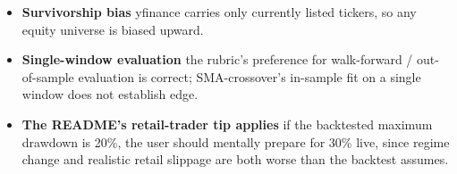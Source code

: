 \begin{itemize}
  \item \textbf{Survivorship bias} \textemdash{} yfinance carries only currently
        listed tickers, so any equity universe is biased upward.
  \item \textbf{Single-window evaluation} \textemdash{} the rubric's preference for
        walk-forward / out-of-sample evaluation is correct; SMA-crossover's
        in-sample fit on a single window does not establish edge.
  \item \textbf{The README's retail-trader tip applies} \textemdash{} if the
        backtested maximum drawdown is 20\%, the user should mentally prepare for
        30\% live, since regime change and realistic retail slippage are both
        worse than the backtest assumes.
\end{itemize}
